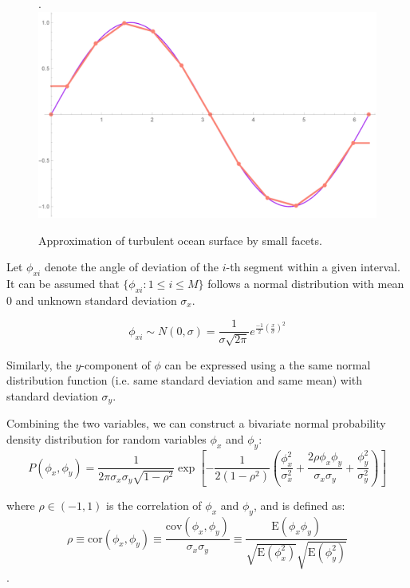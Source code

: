 \documentclass{article}
\begin{document}
\begin{figure}[htbp]
   . \centering
    \includegraphics[scale=.6]{approx.pdf}
    \caption{Approximation of turbulent ocean surface by small facets.}
    \label{fig:line_approx}
\end{figure}

Let $\phi_{xi}$ denote the angle of deviation of the $i$-th segment within a given interval. It can be assumed that $\{\phi_{xi}: 1 \le i \le M\}$ follows a normal distribution with mean 0 and unknown standard deviation $\sigma_x$.

\begin{equation}
    \phi_{xi} \sim N(0,\sigma) = \frac{1}{\sigma \sqrt{2\pi}}e^{\frac{-1}{2}\left(\frac{x}{\sigma}\right)^2}
\end{equation}

Similarly, the $y$-component of $\phi$ can be expressed using a the same normal distribution function (i.e. same standard deviation and same mean) with standard deviation $\sigma_y$.

Combining the two variables, we can construct a bivariate normal probability density distribution for random variables $\phi_x$ and $\phi_y$:
\begin{equation}\label{eqn:prob}
    P(\phi_x,\phi_y) = \frac{1}{2\pi \sigma_x \sigma_y \sqrt{1 - \rho^2}} \exp\left[-\frac{1}{2(1-\rho^2)}\left(\frac{\phi_x^2}{\sigma_x^2} + \frac{2\rho \phi_x \phi_y}{\sigma_x \sigma_y} + \frac{\phi_y^2}{\sigma_y^2}\right)\right]
\end{equation}

where $\rho \in (-1,1)$ is the correlation of $\phi_x$ and $\phi_y$, and is defined as:
\begin{equation}
\rho \equiv \mathrm{cor}(\phi_x,\phi_y) \equiv \frac{\mathrm{cov}(\phi_x,\phi_y)}{\sigma_x \sigma_y} \equiv \frac{\mathrm{E}\left(\phi_x \phi_y\right)}{\sqrt{\mathrm{E}\left(\phi_x^2\right)} \sqrt{\mathrm{E}\left(\phi_y^2\right)}}
\end{equation}.
\end{document}
